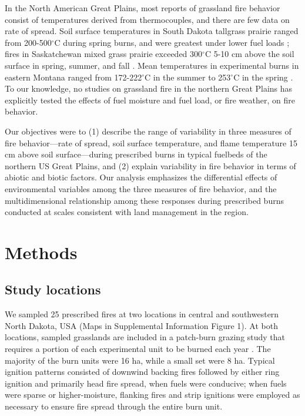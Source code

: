 \documentclass[referee, 
		     sn-basic]{sn-jnl}
\begin{document}
\begin{linenumbers}
In the North American Great Plains, most reports of grassland fire behavior consist of temperatures derived from thermocouples, and there are few data on rate of spread. 
Soil surface temperatures in South Dakota tallgrass prairie ranged from 200-500\(^\circ\)C during spring burns, and were greatest under lower fuel loads \citep{ohrtman2015}; fires in Saskatchewan mixed grass prairie exceeded 300\(^\circ\)C 5-10 cm above the soil surface in spring, summer, and fall \citep{archibold2003}. 
Mean temperatures in experimental burns in eastern Montana ranged from 172-222\(^\circ\)C in the summer to 253\(^\circ\)C in the spring \citep{strong2013, russell2015}. 
To our knowledge, no studies on grassland fire in the northern Great Plains has explicitly tested the effects of fuel moisture and fuel load, or fire weather, on fire behavior.

Our objectives were to (1) describe the range of variability in three
measures of fire behavior---rate of spread, soil surface temperature,
and flame temperature 15 cm above soil surface---during prescribed burns
in typical fuelbeds of the northern US Great Plains, and (2) explain
variability in fire behavior in terms of abiotic and biotic factors.
Our analysis emphasizes the differential effects of environmental variables among the three measures of fire behavior, and the multidimensional relationship among these responses during prescribed burns conducted at scales consistent with land management in the region.

\hypertarget{methods}{%
\section{Methods}\label{methods}}

\hypertarget{study-locations}{%
\subsection{Study locations}\label{study-locations}}

We sampled 25 prescribed fires at two locations in central and
southwestern North Dakota, USA (Maps in Supplemental Information Figure
1). At both locations, sampled grasslands are included in a patch-burn
grazing study that requires a portion of each experimental unit to be
burned each year \citep{spiess2020}. The majority of the burn units were
16 ha, while a small set were 8 ha. Typical ignition patterns consisted
of downwind backing fires followed by either ring ignition and primarily
head fire spread, when fuels were conducive; when fuels were sparse or
higher-moisture, flanking fires and strip ignitions were employed as
necessary to ensure fire spread through the entire burn unit.


\end{linenumbers}
\end{document}
